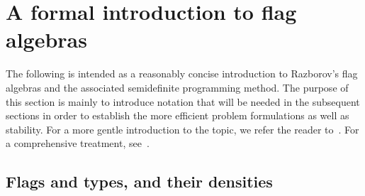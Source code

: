 \documentclass[a4paper,11pt]{article}
\numberwithin{equation}{section}
\begin{document}
\section{A formal introduction to flag algebras} \label{sec:flagalgebras}

The following is intended as a reasonably concise introduction to Razborov's flag algebras and the associated semidefinite programming method. The purpose of this section is mainly to introduce notation that will be needed in the subsequent sections in order to establish the more efficient problem formulations as well as stability. For a more gentle introduction to the topic, we refer the reader to~\cite{SilvaEtal_2016}. For a comprehensive treatment, see~\cite{Razborov_2007, CoreglianoRazborov_2020}.

\subsection{Flags and types, and their densities}\label{sec:def_flags_and_density}
\end{document}
